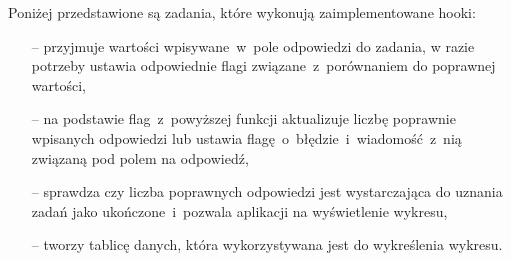 Poniżej przedstawione są zadania, które wykonują zaimplementowane hooki:
\begin{itemize}
  \item [--]  przyjmuje wartości wpisywane~w~pole odpowiedzi do zadania, w
        razie potrzeby ustawia odpowiednie flagi związane~z~porównaniem do poprawnej wartości,
  \item [--]  na podstawie flag~z~powyższej funkcji aktualizuje liczbę
        poprawnie wpisanych odpowiedzi lub ustawia flagę~o~błędzie~i~wiadomość~z~nią związaną pod
        polem na odpowiedź,
  \item [--]  sprawdza czy liczba poprawnych odpowiedzi jest wystarczająca
        do uznania zadań jako ukończone~i~pozwala aplikacji na wyświetlenie wykresu,
  \item [--]  tworzy tablicę danych, która wykorzystywana jest do
        wykreślenia wykresu.
\end{itemize}

